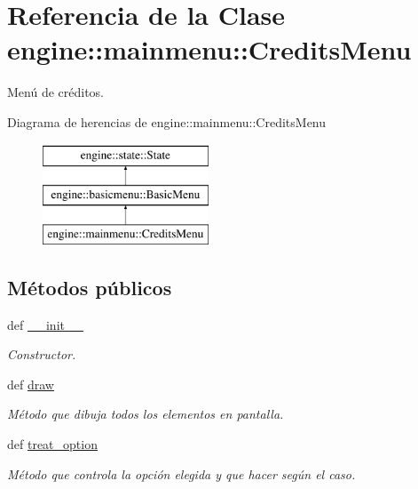 \hypertarget{classengine_1_1mainmenu_1_1CreditsMenu}{
\section{\-Referencia de la \-Clase engine\-:\-:mainmenu\-:\-:\-Credits\-Menu}
\label{classengine_1_1mainmenu_1_1CreditsMenu}
}


\-Menú de créditos.  


\-Diagrama de herencias de engine\-:\-:mainmenu\-:\-:\-Credits\-Menu\begin{figure}[H]
\begin{center}
\leavevmode
\includegraphics[height=3.000000cm]{classengine_1_1mainmenu_1_1CreditsMenu}
\end{center}
\end{figure}
\subsection*{\-Métodos públicos}
\begin{DoxyCompactItemize}
\item 
def \hyperlink{classengine_1_1mainmenu_1_1CreditsMenu_aad646bf73f47b817848861948fcf3150}{\-\_\-\-\_\-init\-\_\-\-\_\-}
\begin{DoxyCompactList}\small\item\em \-Constructor. \end{DoxyCompactList}\item 
def \hyperlink{classengine_1_1mainmenu_1_1CreditsMenu_ad3ab7d12bd8f402ca2cb50305b8a0bcb}{draw}
\begin{DoxyCompactList}\small\item\em \-Método que dibuja todos los elementos en pantalla. \end{DoxyCompactList}\item 
\hypertarget{classengine_1_1mainmenu_1_1CreditsMenu_a5c24dbbaed0410742f3ff520edcd251a}{
def \hyperlink{classengine_1_1mainmenu_1_1CreditsMenu_a5c24dbbaed0410742f3ff520edcd251a}{treat\-\_\-option}}
\label{classengine_1_1mainmenu_1_1CreditsMenu_a5c24dbbaed0410742f3ff520edcd251a}

\begin{DoxyCompactList}\small\item\em \-Método que controla la opción elegida y que hacer según el caso. \end{DoxyCompactList}\end{DoxyCompactItemize}
